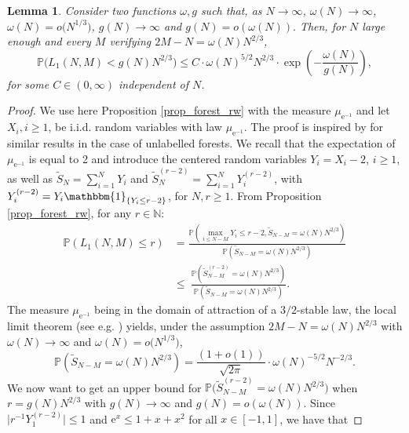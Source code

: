 \documentclass[a4, 11pt]{article}
\numberwithin{equation}{section}
\theoremstyle{plain}
\newtheorem{lemma}[theorem]{Lemma}
\theoremstyle{definition}
\theoremstyle{remark}
\begin{document}
\begin{lemma}\label{lm:forest:super}
Consider two functions $\omega,g$ such that, as $N \rightarrow \infty$, $\omega(N)\to \infty $, $\omega(N)=o\big(N^{1/3}\big)$, $g(N)\to \infty$ and $g(N)=o\left(\omega(N)\right).$ Then, for $N$ large enough and every $M$ verifying $2M-N=\omega(N)N^{2/3}$,
$$\mathbb{P}\big(L_1(N,M)<g(N)N^{2/3}\big)\leq C\cdot \omega(N)^{5/2}N^{2/3} \cdot \exp\left(-\frac{\omega(N)}{g(N)}\right),$$
for some $C\in (0,\infty)$ independent of $N$.
	\end{lemma} 

\begin{proof} We use here Proposition \ref{prop_forest_rw} with the measure $\mu_{\mathrm{e}^{-1}}$ and let $X_i,i\geq 1$, be i.i.d. random variables with law $\mu_{\mathrm{e}^{-1}}$. The proof is inspired by \cite{BernikovichPavlov11} for similar results in the case of unlabelled forests.  We recall that the expectation of $\mu_{\mathrm{e}^{-1}}$ is equal to 2 and introduce the centered random variables $Y_i=X_i-2$, $i\geq 1$, as well as $\tilde{S}_N=\sum_{i=1}^{N}Y_i  $ and
$ \tilde{S}_N^{(r-2)}=\sum_{i=1}^N Y_i^{(r-2)} $, with $Y_i^{(r-2)}=Y_i\mathbbm{1}_{\{Y_i\leq r-2\}}$, for $N,r \geq 1$. From Proposition \ref{prop_forest_rw}, for any $r\in \mathbb N$:
\begin{align*}
\mathbb{P}\left(L_1(N,M)\leq r\right)&=\frac{\mathbb{P}\left(\max_{i\leq N-M}Y_i\leq r-2,\tilde{S}_{N-M}=\omega(N)N^{2/3}\right)}{\mathbb{P}\left(\tilde{S}_{N-M}=\omega(N)N^{2/3}\right) }\\
&\leq~\frac{\mathbb{P}\left(\tilde{S}_{N-M}^{(r-2)}=\omega(N)N^{2/3}\right)}{\mathbb{P}\left(\tilde{S}_{N-M}=\omega(N)N^{2/3}\right)}.
\end{align*}
The measure $\mu_{\mathrm{e}^{-1}}$ being in the domain of attraction of a $3/2$-stable law, the local limit theorem (see e.g. \cite{GnedenkoKolmogorov54}) yields, under the assumption $2M-N=\omega(N)N^{2/3}$ with $\omega(N)\to \infty $ and $\omega(N)=o\big(N^{1/3}\big)$,
\begin{equation}
\label{eq:forest}
\mathbb{P}\left(\tilde{S}_{N-M}=\omega(N)N^{2/3}\right)=\frac{\left(1+o(1)\right)}{\sqrt{2\pi}} \cdot \omega(N)^{-5/2}N^{-2/3}.
\end{equation}
We now want to get an upper bound for $\mathbb{P}\big(\tilde{S}_{N-M}^{(r-2)}=\omega(N)N^{2/3}\big)$ when $r=g(N)N^{2/3}$ with $g(N) \rightarrow \infty$ and $g(N)=o(\omega(N))$. Since $\big\vert r^{-1} Y_1^{(r-2)}\big \vert \leq 1$ and $\mathrm{e}^x\leq 1+x+x^2$ for all $x \in [-1,1]$, we have that

\end{proof}
\end{document}

